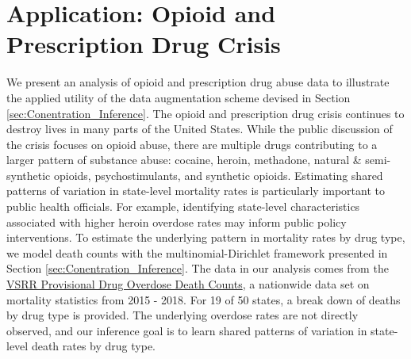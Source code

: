 \documentclass{statsoc}
\begin{document}
\section{Application: Opioid and Prescription Drug Crisis}
\label{sec:Application}
We present an analysis of opioid and prescription drug abuse data to illustrate the applied utility of the data augmentation scheme devised in Section \ref{sec:Conentration_Inference}.  The opioid and prescription drug crisis continues to destroy lives in many parts of the United States. While the public discussion of the crisis focuses on opioid abuse, there are multiple drugs contributing to a larger pattern of substance abuse: cocaine, heroin, methadone, natural \& semi-synthetic opioids, psychostimulants, and synthetic opioids. Estimating shared patterns of variation in state-level mortality rates is particularly important to public health officials.  For example, identifying state-level characteristics associated with higher heroin overdose rates may inform public policy interventions.  To estimate the underlying pattern in mortality rates by drug type, we model death counts with the multinomial-Dirichlet framework presented in Section \ref{sec:Conentration_Inference}.  The data in our analysis comes from the \href{https://healthdata.gov/dataset/vsrr-provisional-drug-overdose-death-counts}{VSRR Provisional Drug Overdose Death Counts}, a nationwide data set on mortality statistics from 2015 - 2018. For 19 of 50 states, a break down of deaths by drug type is provided. The underlying overdose rates are not directly observed, and our inference goal is to learn shared patterns of variation in state-level death rates by drug type.  



\begin{table}
    \caption{\label{tab:VSRR}Deaths by drug type: cocaine, synthetic opioids, heroin, methadone, natural opioids, and psychostimulants. The data is provided at the state level from 2015 - 2018, and the snapshot provided above is the first six rows.}
  \centering
{}
\end{table}
\end{document}
